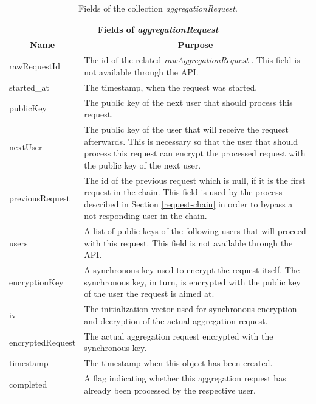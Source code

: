 \begin{table}[]
  \centering
  \begin{tabularx}{\textwidth}{|l|X|}
    \hline
    \multicolumn{2}{|c|}{\textbf{Fields of \textit{aggregationRequest}}}                     \\ \hline
     \multicolumn{1}{|c|}{\textbf{Name}}        & \multicolumn{1}{c|}{\textbf{Purpose}}       \\ \hline
    rawRequestId     & The id of the related \textit{rawAggregationRequest} . This field is not available through the API. \\ \hline
    started\_at      & The timestamp, when the request was started. \\ \hline
    publicKey        & The public key of the next user that should process this request.   \\ \hline
    nextUser        & The public key of the user that will receive the request afterwards. This is necessary so that the user that should process this request can encrypt the processed request with the public key of the next user.
     \\ \hline
    previousRequest        & The id of the previous request which is null, if it is the first request in the chain. This field is used by the process described in Section \ref{request-chain} in order to bypass a not responding user in the chain.
     \\ \hline
    users        & A list of public keys of the following users that will proceed with this request. This field is not available through the API.
     \\ \hline
    encryptionKey        & A synchronous key used to encrypt the request itself. The synchronous key, in turn, is encrypted with the public key of the user the request is aimed at.
     \\ \hline
    iv        & The initialization vector used for synchronous encryption and decryption of the actual aggregation request.
     \\ \hline
    encryptedRequest        & The actual aggregation request encrypted with the synchronous key. \\ \hline
    timestamp        & The timestamp when this object has been created. \\ \hline
    completed        & A flag indicating whether this aggregation request has already been processed by the respective user.
     \\ \hline
  \end{tabularx}
    \caption{Fields of the collection \textit{aggregationRequest}.}
  \label{aggregationRequest}
\end{table}

